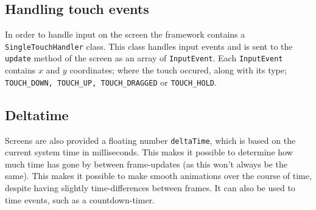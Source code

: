 \subsection{Handling touch events}\label{framework:touchevents}
In order to handle input on the screen the framework contains a \lstinline|SingleTouchHandler| class.
This class handles input events and is sent to the \lstinline|update| method of the screen as an array of \lstinline|InputEvent|.
Each \lstinline|InputEvent| contains $x$ and $y$ coordinates; where the touch occured, along with its type; \lstinline|TOUCH_DOWN, TOUCH_UP, TOUCH_DRAGGED| or \lstinline|TOUCH_HOLD|.

\subsection{Deltatime}\label{framework:deltatime}
Screens are also provided a floating number \lstinline|deltaTime|, which is based on the current system time in milliseconds.
This makes it possible to determine how much time has gone by between frame-updates (as this won't always be the same).
This makes it possible to make smooth animations over the course of time, despite having slightly time-differences between frames.
It can also be used to time events, such as a countdown-timer.